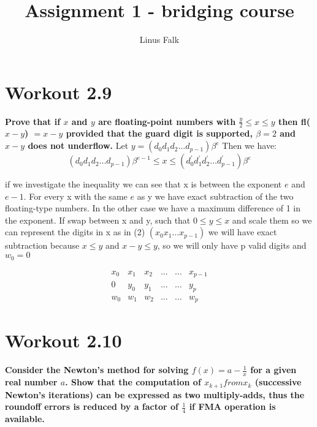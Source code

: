 \documentclass[a4paper]{article}
\title{Assignment 1 - bridging course}
\author{Linus Falk}
\begin{document}
\maketitle



\section{Workout 2.9}
\textbf{Prove that if $x$ and $y$ are floating-point numbers with $\frac{y}{2} \le x \le y$ then fl($x-y$) $=x-y$ provided that the guard digit is supported, $\beta = 2$ and $x-y$ does not underflow.}
\newline 
Let $y =  (d_0 d_1 d_2 \ldots  d_{p-1}) \beta^{e} $ Then we have:
\begin{equation}
	(d_0 d_1 d_2 \ldots  d_{p-1}) \beta^{e-1} \le x \le (d_0^{\prime} d_1^{\prime} d_2^{\prime} \ldots  d^{\prime}_{p-1}) \beta^{e}  
\end{equation}

if we investigate the inequality we can see that x is between the exponent $e$ and  $e-1$. For every x with the same  $e$ as y we have exact subtraction of the two floating-type numbers. In the other case we have a maximum difference of 1 in the exponent. If swap between x and y, such that $0 \le y \le x$ and scale them so we can represent the digits in x as in (2) $(x_0 x_1 \ldots x_{p-1})$ we will have exact subtraction because $x \le y$ and $x-y \le y$, so we will only have p valid digits and $w_0 = 0$ 


\begin{equation}
	\begin{matrix} 
		x_0 &  x_1 & x_2 & \ldots & \ldots&  x_{p-1}\\
		0 &  y_0 &  y_1 &  \ldots  & \ldots &  y_{p} \\ \hline
		w_0 &  w_1 &  w_2 &  \ldots & \ldots&  w_{p}
  
  	\end{matrix} 
\end{equation}


\newpage
\section{Workout 2.10}
\textbf{Consider the Newton’s method for solving $f(x) =a - \frac{1}{x}$ for a given real number $a$. Show that the computation of $x_{k+1} from x_k$ (successive Newton’s iterations) can be expressed as two multiply-adds, thus the roundoff errors is reduced by a factor of $\frac{1}{4}$ if FMA operation is available.}
\end{document}
